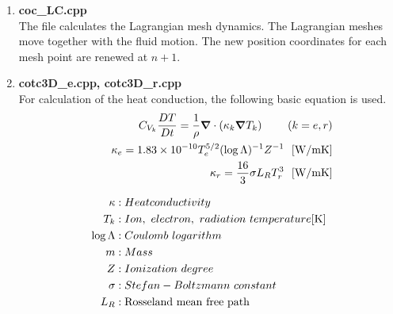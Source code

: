 \begin{enumerate}
\item {\bf coc\_LC.cpp}\\
The file calculates the Lagrangian mesh dynamics. The Lagrangian meshes move together with the fluid motion. The new position coordinates for each mesh point are renewed at $n+1$. 


\item {\bf cotc3D\_e.cpp, cotc3D\_r.cpp}\\
For calculation of the heat conduction, the following basic equation is used\cite{Christiansen}.
\begin{eqnarray}
		&&C_{V_k}\frac{DT}{Dt}=\frac{1}{\rho}{\bm \nabla}\cdot(\kappa_k{\bm \nabla}T_k)\ \ \ \ \ \ \ (k=e,r)\\
		&&\ \ \ \ \kappa_e=1.83\times10^{-10}T^{5/2}_{e}(\log{\Lambda})^{-1}Z^{-1}\ \ [{\rm W/mK}]\nonumber\\
		&&\ \ \ \ \kappa_r=\frac{16}{3}\sigma L_RT^3_r\ \ [{\rm W/mK}]\nonumber
	\end{eqnarray}
	
\begin{align*}
\kappa&: Heat conductivity\\
T_k&: Ion,\ electron,\ radiation\ temperature[\rm K]\\
\log{\Lambda}&: Coulomb\ logarithm\\
m&: Mass\\
Z&: Ionization\ degree\\
\sigma&: Stefan-Boltzmann\ constant\\
L_R&: \rm {Rosseland\ mean\ free\ path}\\
\end{align*}


\end{enumerate}
